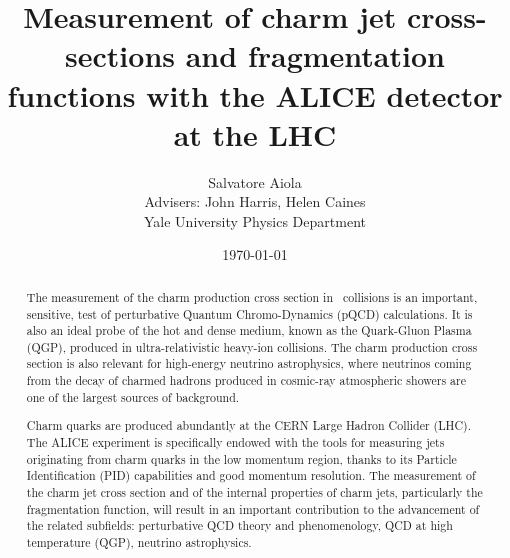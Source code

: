 \documentclass[12pt, a4paper, twoside, titlepage]{article}
\title{Measurement of charm jet cross-sections and fragmentation functions
with the ALICE detector at the LHC}
\author{Salvatore Aiola  \\
	Advisers: John Harris, Helen Caines \\
	Yale University Physics Department
	}
\date{\today}
\begin{document}
\maketitle

\begin{abstract}
The measurement of the charm production cross section in \pp\ collisions is an important, sensitive, test of perturbative Quantum Chromo-Dynamics (pQCD) calculations.
It is also an ideal probe of the hot and dense medium, known as the Quark-Gluon Plasma (QGP), produced in ultra-relativistic heavy-ion collisions.
The charm production cross section is also relevant for high-energy neutrino astrophysics, where neutrinos coming from the decay of charmed hadrons produced
in cosmic-ray atmospheric showers are one of the largest sources of background.

Charm quarks are produced abundantly at the CERN Large Hadron Collider (LHC). The ALICE experiment is specifically endowed with the tools for measuring
jets originating from charm quarks in the low momentum region, thanks to its Particle Identification (PID) capabilities and good momentum resolution.
The measurement of the charm jet cross section and of the internal properties of charm jets, particularly the fragmentation function, will result in an important
contribution to the advancement of the related subfields: perturbative QCD theory and phenomenology, QCD at high temperature (QGP), neutrino astrophysics.
\end{abstract}

\tableofcontents %
\newpage
\end{document}
